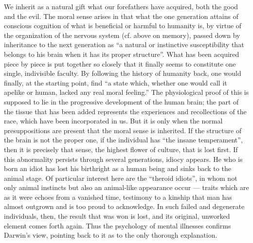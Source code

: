 \documentclass[12pt,a4paper,openany]{book}
\newcommand{\opage}[1]{\marginnote{\footnotesize\textit{[#1]}}}
\begin{document}
We inherit as a natural gift what our forefathers
have acquired, both the good and the evil. The moral
sense arises in that what the one generation attains
of conscious cognition of what is beneficial or harmful
to humanity is, by virtue of the organization of the nervous system (cf.
above on memory), passed down by inheritance to the next generation
as ``a natural or instinctive susceptibility that belongs to
his brain when it has its proper structure''. What has been
acquired piece by piece is put together so closely that it finally
seems to constitute one single, indivisible faculty. By following
the history of humanity back, one would finally, at the starting point,
find ``a state which, whether one would
call it apelike or human, lacked any real moral
feeling.'' The physiological proof of this is supposed to lie in the
progressive development of the human brain; the part of the
tissue that has been added represents the experiences
and recollections of the race, which have been incorporated in us. But
it is only when the normal presuppositions are present that
the moral sense is inherited. If the structure of the brain is not
the proper one, if the individual has ``the insane temperament'', then
it is precisely that sense, the highest flower of culture, that is lost
first. If this abnormality persists through several generations,
idiocy appears. He who is born an idiot has
\opage{327}lost his birthright as a human being and sinks back to
the animal stage. Of particular interest here are the ``theroid
idiots'', in whom not only animal instincts but also an
animal-like appearance occur --- traits which are as it were
echoes from a vanished time, testimony to a kinship that
man has almost outgrown and is too proud to acknowledge.
In such failed and degenerate individuals, then, the result
that was won is lost, and its original, unworked
element comes forth again. Thus the psychology of mental illnesses
confirms Darwin's view, pointing back
to it as to the only thorough explanation.
\end{document}
